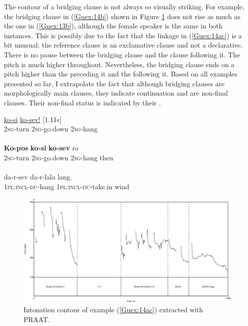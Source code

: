 \documentclass[output=paper]{LSP/langsci}
\begin{document}
The  contour of a bridging clause is not always so visually striking. For example, the bridging clause in (\ref{Guex:14b}) shown in  Figure \ref{GuF4} does not rise as much as the one in (\ref{Guex:13b}), although the female speaker is the same in both instances. This is possibly due to the fact that the linkage in (\ref{Guex:14ac}) is a bit unusual: the reference clause is an exclamative clause and not a declarative. There is no pause between the bridging clause and the clause following it. The pitch is much higher throughout. Nevertheless, the bridging clause ends on a pitch higher than the  preceding it and the  following it. Based on all examples presented so far, I  extrapolate the fact that although bridging clauses are morphologically main clauses, they indicate continuation and are non-final clauses. Their non-final status is indicated by their .


\begin{exe}
\ex \label{Guex:14ac}
\begin{xlist}
\ex \label{Guex:14a}
\gll \underline{}          \underline{ko-si}                 \underline{ko-sev!}     [1.11s]\\
\textsc{2sg}-turn    \textsc{2sg}-go.down   \textsc{2sg}-hang \\
\glt {}\\
\ex \label{Guex:14b}
\gll \textbf{Ko-pos}          \textbf{ko-si}               \textbf{ko-sev}     ro \\
\textsc{2sg}-turn    \textsc{2sg}-go.down   \textsc{2sg}-hang then\\
\glt {}\\
\ex \label{Guex:14c}
\gll   da-r-sev                  da-r-lala               lang.\\     	       
 \textsc{1pl:incl-du}-hang     \textsc{1pl:incl-du}-take.in   wind\\
\glt {} 
\end{xlist}
\end{exe}

\begin{figure}[ht]
\includegraphics[width=4.8in]{figures/guerinFig4x.eps}
\caption{Intonation contour of example (\ref{Guex:14ac}) extracted with PRAAT. \label{GuF4}}
\end{figure}
\end{document}
